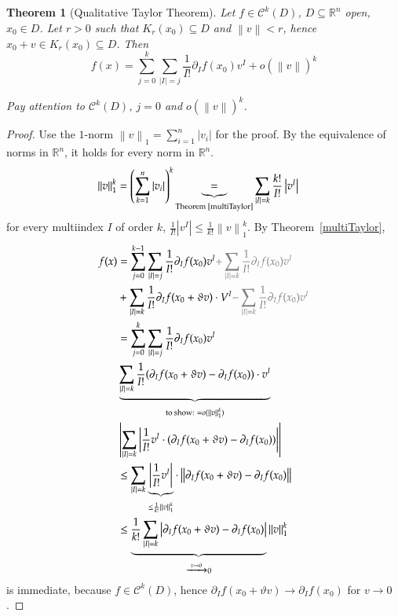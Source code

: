 \documentclass{article}
\newtheorem{theorem}{Theorem}  \numberwithin{theorem}{section}
\newcommand{\norm}[1]{\left\|#1\right\|}
\newcommand{\card}[1]{\left|#1\right|}
\begin{document}
\begin{theorem}[Qualitative Taylor Theorem] %
  Let $f \in \mathcal C^k(D)$, $D \subseteq \mathbb R^n$ open, $x_0 \in D$.
  Let $r > 0$ such that $K_r(x_0) \subseteq D$ and $\norm{v} < r$, hence $x_0 + v \in K_r(x_0) \subseteq D$.
  Then
  \[ f(x) = \sum_{j=0}^k \sum_{\card{I} = j} \frac{1}{I!} \partial_I f(x_0) v^I + o(\norm{v})^k \]

  Pay attention to $\mathcal C^k(D)$, $j=0$ and $o(\norm{v})^k$.
\end{theorem}

\begin{proof}
  Use the $1$-norm $\norm{v}_1 = \sum_{i=1}^n \card{v_i}$ for the proof. By the equivalence of norms in $\mathbb R^n$, it holds for every norm in $\mathbb R^n$.
  \begin{align*}
    \norm{v}_1^k &= \left(\sum_{k=1}^n \card{v_i}\right)^k \underbrace{=}_{\text{Theorem~\ref{multiTaylor}}}
                    \sum_{\card{I} = k} \frac{k!}{I!} \card{v^I}
  \end{align*}
  for every multiindex $I$ of order $k$, $\frac{1}{I!} \card{v^I} \leq \frac{1}{k!} \norm{v}_1^k$.
  By Theorem~\ref{multiTaylor},
  \begin{align*}
    f(x) &= \sum_{j=0}^{k-1} \sum_{\card{I}=j} \frac{1}{I!} \partial_I f(x_0) v^I {\color{gray} + \sum_{\card{I} = k} \frac{1}{I!} \partial_I f(x_0) v^I} \\
         &+ \sum_{\card{I} = k} \frac{1}{I!} \partial_I f(x_0 + \vartheta v) \cdot V^I {\color{gray} - \sum_{\card{I} = k} \frac{1}{I!} \partial_I f(x_0) v^I} \\
         &= \sum_{j=0}^k \sum_{\card{I}=j} \frac{1}{I!} \partial_I f(x_0) v^I \\
         & \underbrace{\sum_{\card{I}=k} \frac{1}{I!} (\partial_I f(x_0 + \vartheta v) - \partial_I f(x_0)) \cdot v^I}_{\text{to show: } = o(\norm{v}_1^k)} \\
         & \card{\sum_{\card{I} = k} \card{\frac{1}{I!} v^I \cdot (\partial_I f(x_0 + \vartheta v) - \partial_I f(x_0))}} \\
         & \leq \sum_{\card{I} = k} \underbrace{\card{\frac{1}{I!} v^I}}_{\leq \frac{1}{k!} \norm{v}_1^k} \cdot \norm{\partial_I f(x_0 + \vartheta v) - \partial_I f(x_0)} \\
         & \leq \underbrace{\frac{1}{k!} \sum_{\card{I} = k} \card{\partial_I f(x_0 + \vartheta v) - \partial_I f(x_0)}}_{\xrightarrow{v \to 0} 0} \norm{v}_1^k
  \end{align*}
  is immediate, because $f \in \mathcal C^k(D)$, hence $\partial_I f(x_0 + \vartheta v) \to \partial_I f(x_0)$ for $v \to 0$.
\end{proof}
\end{document}
